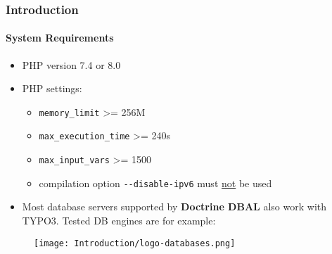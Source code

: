 %

\begin{frame}[fragile]
	\frametitle{Introduction}
	\framesubtitle{System Requirements}

	\begin{itemize}
		\item PHP version 7.4 or 8.0
		\item PHP settings:

			\begin{itemize}
				\item \texttt{memory\_limit} >= 256M
				\item \texttt{max\_execution\_time} >= 240s
				\item \texttt{max\_input\_vars} >= 1500
				\item compilation option \texttt{-}\texttt{-disable-ipv6} must \underline{not} be used
			\end{itemize}

		\item Most database servers supported by \textbf{Doctrine DBAL} also work with TYPO3.
			Tested DB engines are for example:
	\end{itemize}

	\begin{figure}
		\texttt{[image: Introduction/logo-databases.png]}
	\end{figure}

\end{frame}

